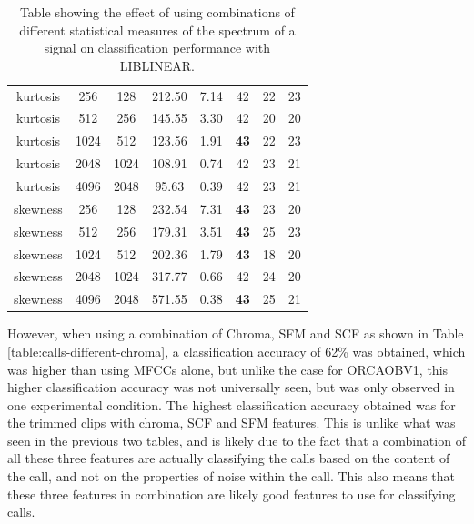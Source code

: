 \documentclass[12pt,oneside]{book}
\begin{document}
\begin{table}
\begin{tabular}{|c|c|c|c|c|c|c|c|}
\hline
kurtosis & 256 & 128       &   212.50  &    7.14  &  42           & 22 & 23 \\
kurtosis & 512 & 256       &   145.55  &    3.30  &  42           & 20 & 20 \\
kurtosis & 1024 & 512      &   123.56  &    1.91  &  \textbf{43}  & 22 & 23 \\
kurtosis & 2048 & 1024     &   108.91  &    0.74  &  42           & 23 & 21 \\
kurtosis & 4096 & 2048     &    95.63  &    0.39  &  42           & 23 & 21 \\
\hline
skewness & 256 & 128       &   232.54  &    7.31  &  \textbf{43}  & 23 & 20  \\
skewness & 512 & 256       &   179.31  &    3.51  &  \textbf{43}  & 25 & 23 \\
skewness & 1024 & 512      &   202.36  &    1.79  &  \textbf{43}  & 18 & 20 \\
skewness & 2048 & 1024     &   317.77  &    0.66  &  42           & 24 & 20 \\
skewness & 4096 & 2048     &   571.55  &    0.38  &  \textbf{43}  & 25 & 21 \\
\hline
\end{tabular}
\caption{Table showing the effect of using
  combinations of different statistical measures of the spectrum of a
  signal on classification performance with LIBLINEAR.}
\label{table:calls-different-spectral}
\end{table}

However, when using a combination of Chroma, SFM and SCF as shown in
Table \ref{table:calls-different-chroma}, a classification accuracy of
62\% was obtained, which was higher than using MFCCs alone, but unlike
the case for ORCAOBV1, this higher classification accuracy was not
universally seen, but was only observed in one experimental condition.
The highest classification accuracy obtained was for the trimmed clips
with chroma, SCF and SFM features.  This is unlike what was seen in
the previous two tables, and is likely due to the fact that a
combination of all these three features are actually classifying the
calls based on the content of the call, and not on the properties of
noise within the call.  This also means that these three features in
combination are likely good features to use for classifying calls.
\end{document}
